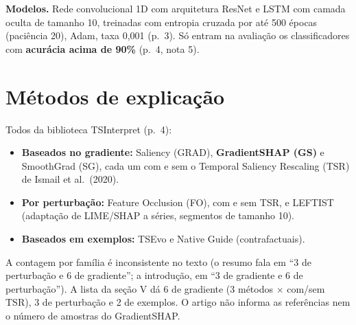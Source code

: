 \documentclass[11pt,a4paper]{article}
\begin{document}
\textbf{Modelos.} Rede convolucional 1D com arquitetura ResNet e LSTM com camada oculta de tamanho 10, treinadas com entropia cruzada por até 500 épocas (paciência 20), Adam, taxa 0,001 (p.~3). Só entram na avaliação os classificadores com \textbf{acurácia acima de 90\%} (p.~4, nota 5).

\section{Métodos de explicação}
Todos da biblioteca TSInterpret (p.~4):
\begin{itemize}
\item \textbf{Baseados no gradiente:} Saliency (GRAD), \textbf{GradientSHAP (GS)} e SmoothGrad (SG), cada um com e sem o Temporal Saliency Rescaling (TSR) de Ismail et al.\ (2020).
\item \textbf{Por perturbação:} Feature Occlusion (FO), com e sem TSR, e LEFTIST (adaptação de LIME/SHAP a séries, segmentos de tamanho 10).
\item \textbf{Baseados em exemplos:} TSEvo e Native Guide (contrafactuais).
\end{itemize}
A contagem por família é inconsistente no texto (o resumo fala em ``3 de perturbação e 6 de gradiente''; a introdução, em ``3 de gradiente e 6 de perturbação''). A lista da seção V dá 6 de gradiente (3 métodos $\times$ com/sem TSR), 3 de perturbação e 2 de exemplos. O artigo não informa as referências nem o número de amostras do GradientSHAP.
\end{document}
